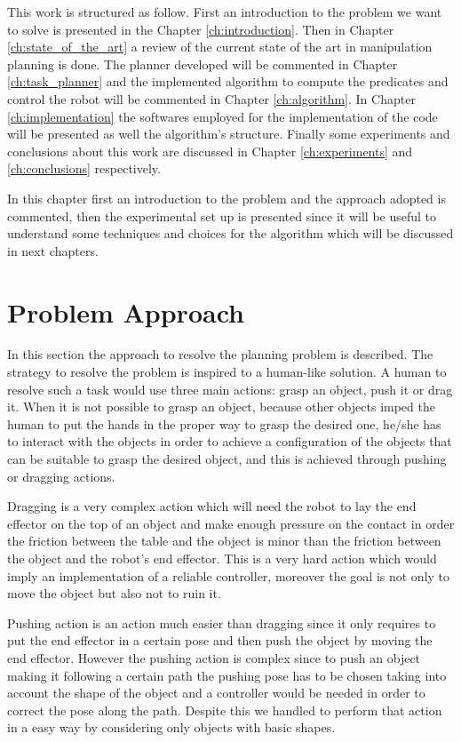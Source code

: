 This work is structured as follow. First an introduction to the problem we want to solve is presented in the Chapter \ref{ch:introduction}. Then in Chapter \ref{ch:state_of_the_art} a review of the current state of the art in manipulation planning is done. The planner developed will be commented in Chapter \ref{ch:task_planner} and the implemented algorithm to compute the predicates and control the robot will be commented in Chapter \ref{ch:algorithm}. In Chapter \ref{ch:implementation} the softwares employed for the implementation of the code will be presented as well the algorithm's structure. Finally some experiments and conclusions about this work are discussed in Chapter \ref{ch:experiments} and \ref{ch:conclusions} respectively.

In this chapter first an introduction to the problem and the approach adopted is commented, then the experimental set up is presented since it will be useful to understand some techniques and choices for the algorithm which will be discussed in next chapters. 

\section{Problem Approach}
In this section the approach to resolve the planning problem is described. The strategy to resolve the problem is inspired to a human-like solution. A human to resolve such a task would use three main actions: grasp an object, push it or drag it. When it is not possible to grasp an object, because other objects imped the human to put the hands in the proper way to grasp the desired one, he/she has to interact with the objects in order to achieve a configuration of the objects that can be suitable to grasp the desired object, and this is achieved through pushing or dragging actions. 

Dragging is a very complex action which will need the robot to lay the end effector on the top of an object and make enough pressure on the contact in order the friction between the table and the object is minor than the friction between the object and the robot's end effector. This is a very hard action which would imply an implementation of a reliable controller, moreover the goal is not only to move the object but also not to ruin it.

Pushing action is an action much easier than dragging since it only requires to put the end effector in a certain pose and then push the object by moving the end effector. However the pushing action is complex since to push an object making it following a certain path the pushing pose has to be chosen taking into account the shape of the object and a controller would be needed in order to correct the pose along the path. Despite this we handled to perform that action in a easy way by considering only objects with basic shapes.

